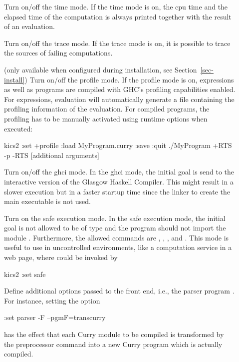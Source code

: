 \begin{description}
\item[]
Turn on/off the time mode. If the time mode is on,
the cpu time and the elapsed time
of the computation is always printed together with the result
of an evaluation.

\item[]
Turn on/off the trace mode. If the trace mode is on,
it is possible to trace the sources of failing computations.

\item[]
(only available when configured during installation, see Section~\ref{sec-install})
Turn on/off the profile mode. If the profile mode is on,
expressions as well as programs are compiled with GHC's profiling
capabilities enabled. For expressions, evaluation will automatically
generate a file  containing the profiling information
of the evaluation.
For compiled programs, the profiling has to be manually activated
using runtime options when executed:
\begin{curry}
kics2 :set +profile :load MyProgram.curry :save :quit
./MyProgram +RTS -p -RTS [additional arguments]
\end{curry}

\item[]
Turn on/off the ghci mode.
In the ghci mode, the initial goal is send to the interactive version
of the Glasgow Haskell Compiler. This might result in a slower
execution but in a faster startup time since the linker
to create the main executable is not used.

\item[]
Turn on the safe execution mode.
In the safe execution mode, the initial goal is
not allowed to be of type  and the program should not
import the module .
Furthermore, the allowed commands are
, , , and .
This mode is useful to use \CYS in uncontrolled environments,
like a computation service in a web page, where \CYS could
be invoked by
\begin{curry}
kics2 :set safe
\end{curry}

\item[]
Define additional options passed to the \CYS front end, i.e.,
the parser program .
For instance, setting the option
\begin{curry}
:set parser -F --pgmF=transcurry
\end{curry}
has the effect that each Curry module to be compiled is
transformed by the preprocessor command 
into a new Curry program which is actually compiled.


\end{description}
